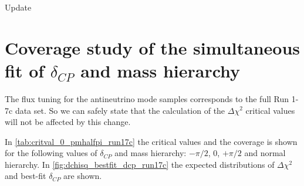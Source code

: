 %
% 

{\huge{Update}}
\section{Coverage study of the simultaneous fit of $\delta_{CP}$ and mass hierarchy}
\label{sec:coverage_deltacp}


The flux tuning for the antineutrino mode samples corresponds to the full Run 1-7c data set.
So we can safely state that the calculation of the $\Delta \chi^2$ critical values will not be affected 
by this change.

In \cref{tab:critval_0_pmhalfpi_run17c} the critical values and the coverage is shown for the following values
of $\delta_{CP}$ and mass hierarchy: $-\pi/2$, 0, $+\pi/2$ and normal hierarchy.
In \cref{fig:dchisq_bestfit_dcp_run17c} the expected distributions of $\Delta \chi^2$   
and best-fit $\delta_{CP}$ are shown. 


